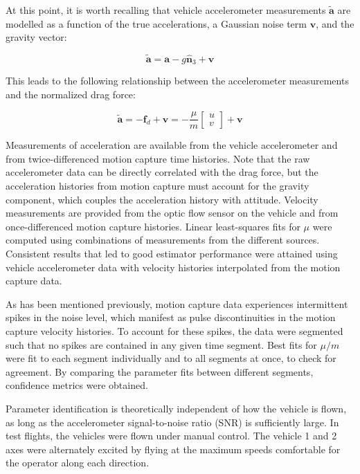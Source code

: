 \documentclass{article}
\newcommand{\B}[1]{\textbf{#1}} %
\newcommand{\U}[1]{\hat{\textbf{#1}}} %
\begin{document}
At this point, it is worth recalling that vehicle accelerometer measurements $\tilde{\B{a}}$ are modelled as a function of the true accelerations, a Gaussian noise term $\B{v}$, and the gravity vector:

\begin{equation}
\tilde{\B{a}} = \B{a} - g\U{n}_3 + \B{v}
\end{equation}

This leads to the following relationship between the accelerometer measurements and the normalized drag force:

\begin{equation}
\tilde{\B{a}} = -\B{f}_d + \B{v} = -\frac{\mu}{m}\begin{bmatrix}
u\\v
\end{bmatrix} + \B{v}
\end{equation}

Measurements of acceleration are available from the vehicle accelerometer and from twice-differenced motion capture time histories. Note that the raw accelerometer data can be directly correlated with the drag force, but the acceleration histories from motion capture must account for the gravity component, which couples the acceleration history with attitude. Velocity measurements are provided from the optic flow sensor on the vehicle and from once-differenced motion capture histories. Linear least-squares fits for $\mu$ were computed using combinations of measurements from the different sources. Consistent results that led to good estimator performance were attained using vehicle accelerometer data with velocity histories interpolated from the motion capture data.

As has been mentioned previously, motion capture data experiences intermittent spikes in the noise level, which manifest as pulse discontinuities in the motion capture velocity histories. To account for these spikes, the data were segmented such that no spikes are contained in any given time segment. Best fits for $\mu/m$ were fit to each segment individually and to all segments at once, to check for agreement. By comparing the parameter fits between different segments, confidence metrics were obtained.

Parameter identification is theoretically independent of how the vehicle is flown, as long as the accelerometer signal-to-noise ratio (SNR) is sufficiently large. In test flights, the vehicles were flown under manual control. The vehicle 1 and 2 axes were alternately excited by flying at the maximum speeds comfortable for the operator along each direction.
\end{document}
